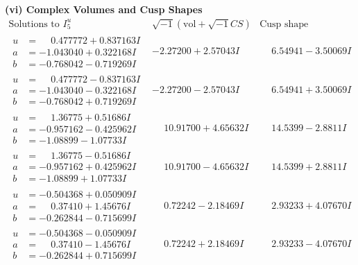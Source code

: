 \documentclass[1p]{elsarticle_modified}
\theoremstyle{definition}
\newcommand{\I}{\sqrt{-1}}
\begin{document}
\newpage\flushleft \textbf{(vi) Complex Volumes and Cusp Shapes}
$$\begin{array}{c|c|c}  
\text{Solutions to }I^u_{5}& \I (\text{vol} + \sqrt{-1}CS) & \text{Cusp shape}\\
 \hline 
\begin{aligned}
u &= \phantom{-}0.477772 + 0.837163 I \\
a &= -1.043040 + 0.322168 I \\
b &= -0.768042 - 0.719269 I\end{aligned}
 & -2.27200 + 2.57043 I & \phantom{-}6.54941 - 3.50069 I \\ \hline\begin{aligned}
u &= \phantom{-}0.477772 - 0.837163 I \\
a &= -1.043040 - 0.322168 I \\
b &= -0.768042 + 0.719269 I\end{aligned}
 & -2.27200 - 2.57043 I & \phantom{-}6.54941 + 3.50069 I \\ \hline\begin{aligned}
u &= \phantom{-}1.36775 + 0.51686 I \\
a &= -0.957162 - 0.425962 I \\
b &= -1.08899 - 1.07733 I\end{aligned}
 & \phantom{-}10.91700 + 4.65632 I & \phantom{-}14.5399 - 2.8811 I \\ \hline\begin{aligned}
u &= \phantom{-}1.36775 - 0.51686 I \\
a &= -0.957162 + 0.425962 I \\
b &= -1.08899 + 1.07733 I\end{aligned}
 & \phantom{-}10.91700 - 4.65632 I & \phantom{-}14.5399 + 2.8811 I \\ \hline\begin{aligned}
u &= -0.504368 + 0.050909 I \\
a &= \phantom{-}0.37410 + 1.45676 I \\
b &= -0.262844 - 0.715699 I\end{aligned}
 & \phantom{-}0.72242 - 2.18469 I & \phantom{-}2.93233 + 4.07670 I \\ \hline\begin{aligned}
u &= -0.504368 - 0.050909 I \\
a &= \phantom{-}0.37410 - 1.45676 I \\
b &= -0.262844 + 0.715699 I\end{aligned}
 & \phantom{-}0.72242 + 2.18469 I & \phantom{-}2.93233 - 4.07670 I \\ \hline\begin{aligned}

\end{aligned}
\end{array}$$
\end{document}
